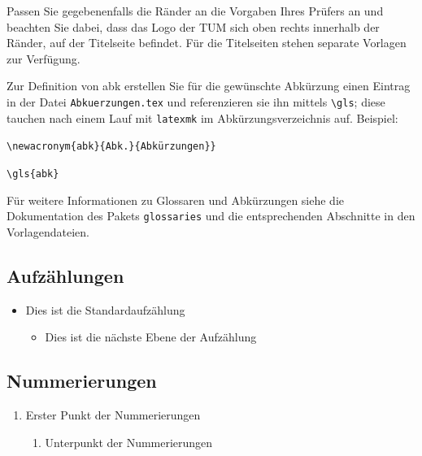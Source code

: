 \clearpage

Passen Sie gegebenenfalls die Ränder an die Vorgaben Ihres Prüfers an und
beachten Sie dabei, dass das Logo der TUM sich oben rechts innerhalb der
Ränder, auf der Titelseite befindet. Für die Titelseiten stehen separate
Vorlagen zur Verfügung.

Zur Definition von \gls{abk} erstellen Sie für die gewünschte Abkürzung einen
Eintrag in der Datei \texttt{Abkuerzungen.tex} und referenzieren sie ihn
mittels \texttt{\textbackslash{}gls}; diese tauchen nach einem Lauf mit
\texttt{latexmk} im Abkürzungsverzeichnis auf. Beispiel:

\vspace{-\baselineskip}
\begin{description}[leftmargin=1em+5mm, labelindent=5mm]
\item[Definition in \texttt{Abkuerzungen.tex}:] \texttt{\textbackslash{}newacronym\{abk\}\{Abk.\}\{Abkürzungen\}\}}
\item[Referenzierung:] \texttt{\textbackslash{}gls\{abk\}}
\end{description}

Für weitere Informationen zu Glossaren und Abkürzungen siehe die Dokumentation
des Pakets \texttt{glossaries} und die entsprechenden Abschnitte in den
Vorlagendateien.


\subsection[]{Aufzählungen}

\begin{itemize}
\item Dies ist die Standardaufzählung
    \begin{itemize}
    \item Dies ist die nächste Ebene der Aufzählung
    \end{itemize}
\end{itemize}


\subsection[]{Nummerierungen}

\begin{enumerate}
\item Erster Punkt der Nummerierungen
    \begin{enumerate}
    \item Unterpunkt der Nummerierungen
    \end{enumerate}
\end{enumerate}
\clearpage

